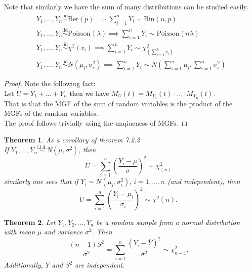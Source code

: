 \documentclass[a4paper,12pt]{article}
\theoremstyle{nonitalic}
\newtheorem{theorem}{Theorem}[subsection]
\begin{document}
    Note that similarly we have the sum of many distributions can be studied easily.
    \[\begin{aligned}
        &Y_1, \ldots, Y_n \overset{\text{iid}}{\sim} \text{Ber}(p) \implies \sum_{i=1}^{n} Y_i \sim \text{Bin}(n, p) \\
        &Y_1, \ldots, Y_n \overset{\text{iid}}{\sim} \text{Poisson}(\lambda) \implies \sum_{i=1}^{n} Y_i \sim \text{Poisson}(n\lambda) \\
        &Y_1, \ldots, Y_n \overset{\text{iid}}{\sim} \chi^2(v_i) \implies \sum_{i=1}^{n} Y_i \sim \chi^2_{\left(\sum\limits_{i=1}^{n} v_i\right)}\\
        &Y_1, \ldots, Y_n \overset{\text{iid}}{\sim} N(\mu_i, \sigma^2_i) \implies \sum_{i=1}^{n} Y_i \sim N\left(\sum\limits_{i=1}^{n} \mu_i, \sum\limits_{i=1}^{n} \sigma^2_i\right)
    \end{aligned}\]

    \begin{proof}
        Note the following fact:\\
        Let $U = Y_1 + \ldots + Y_n$ then we have $M_U(t) = M_{Y_1}(t) \cdot \ldots \cdot M_{Y_n}(t)$.\\
        That is that the MGF of the sum of random variables is the product of the MGFs of the random variables.\\
        The proof follows trivially using the unqiueness of MGFs.
    \end{proof}

    \begin{theorem}
        As a corollary of theorem 7.2.2\\
        If \( Y_1, \ldots, Y_n \overset{\text{i.i.d.}}{\sim} N(\mu, \sigma^2) \), then
        \[
            U = \sum_{i=1}^{n} \left( \frac{Y_i - \mu}{\sigma} \right)^2 \sim \chi^2_{(n)}
        \]
        similarly one sees that if \( Y_i \sim N(\mu_i, \sigma_i^2), \, i = 1, \ldots, n \) (and independent), then
        \[
        U = \sum_{i=1}^{n} \left( \frac{Y_i - \mu_i}{\sigma_i} \right)^2 \sim \chi^2(n).
        \]
    \end{theorem}

    \begin{theorem}
        Let \( Y_1, Y_2, \ldots, Y_n \) be a random sample from a normal distribution with mean \(\mu\) and variance \(\sigma^2\). Then
        \[
        \frac{(n-1)S^2}{\sigma^2} = \sum_{i=1}^{n} \frac{(Y_i - \overline{Y})^2}{\sigma^2} \sim \chi^2_{n-1}.
        \]
        Additionally, \(\overline{Y}\) and \(S^2\) are independent.
    \end{theorem}
\end{document}
